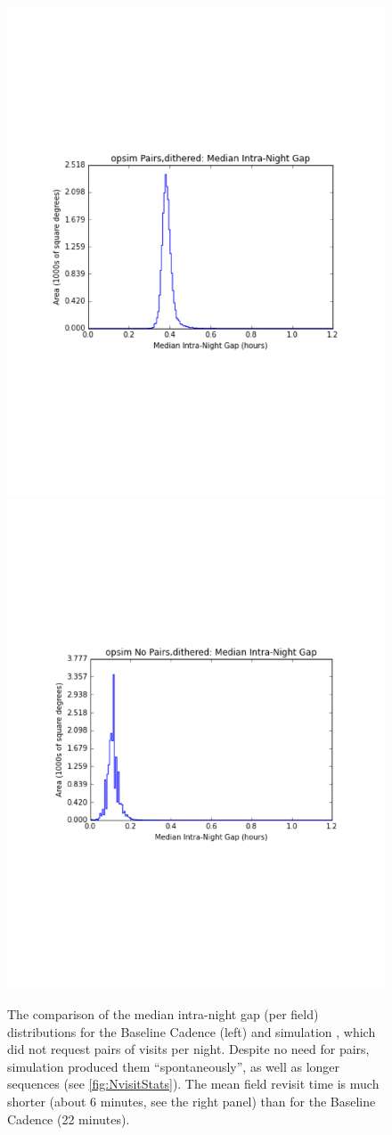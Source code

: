 \begin{figure}[t!]
\vskip -1.2in
\includegraphics[angle=0,width=0.49\hsize:,clip]{figs/medintranight1.pdf}
\includegraphics[angle=0,width=0.49\hsize:,clip]{figs/medintranight2.pdf}
\vskip -1.3in
\caption{%
The comparison of the median intra-night gap (per field) distributions for the
Baseline Cadence (left)
and simulation , which did not request pairs of visits per night.
Despite no need for pairs, simulation  produced them ``spontaneously'',
as well as longer sequences (see \autoref{fig:NvisitStats}). The mean field revisit
time is much shorter (about 6 minutes, see the right panel) than for the Baseline Cadence
(22 minutes).}
\label{fig:intranightgapCompare}
\end{figure}


